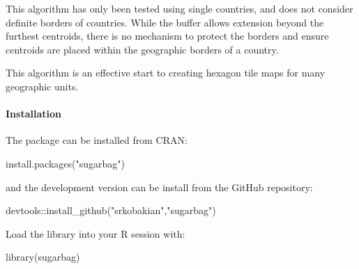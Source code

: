 This algorithm has only been tested using single countries, and does not
consider definite borders of countries. While the buffer allows
extension beyond the furthest centroids, there is no mechanism to
protect the borders and ensure centroids are placed within the
geographic borders of a country.

This algorithm is an effective start to creating hexagon tile maps for
many geographic units.

\hypertarget{installation}{%
\paragraph{Installation}\label{installation}}

The package can be installed from CRAN:

\begin{Schunk}
\begin{Sinput}
install.packages("sugarbag")
\end{Sinput}
\end{Schunk}

and the development version can be install from the GitHub repository:

\begin{Schunk}
\begin{Sinput}
devtools::install_github("srkobakian","sugarbag")
\end{Sinput}
\end{Schunk}

Load the library into your R session with:

\begin{Schunk}
\begin{Sinput}
library(sugarbag)
\end{Sinput}
\end{Schunk}



\address{%
Stephanie Kobakian\\
Monash University\\%
Department of Econometrics and Business Statistics\\
%
%
%
\\\href{mailto:stephanie.kobakian@monash.edu}{\nolinkurl{stephanie.kobakian@monash.edu}}
}

\address{%
Dianne Cook\\
Monash University\\%
Department of Econometrics and Business Statistics\\
%
%
%
\\\href{mailto:dicook@monash.edu}{\nolinkurl{dicook@monash.edu}}
}

